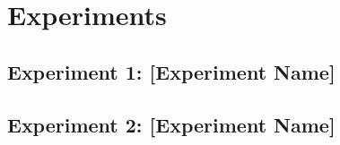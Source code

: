 \section{Experiments}
\label{sec:experiments}



\subsection{Experiment 1: [Experiment Name]}




\subsection{Experiment 2: [Experiment Name]}

